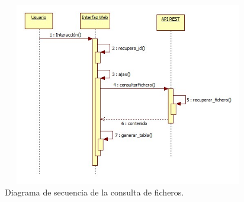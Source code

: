 \begin{figure}[H]
\centering
\includegraphics[width=11cm,height=8cm]{figuras/sec_consultar_fichero.jpg}
\caption{Diagrama de secuencia de la consulta de ficheros.}
\label{fig:sec_consultar_fichero}
\end{figure}
